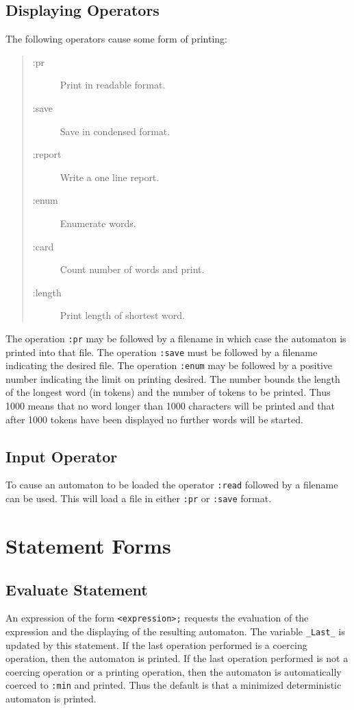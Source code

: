\subsection{Displaying Operators}
The following operators cause some form of printing:
\begin{quote}
\begin{description}
\item[:pr] Print in readable format.
\item[:save] Save in condensed format.
\item[:report] Write a one line report.
\item[:enum] Enumerate words.
\item[:card] Count number of words and print.
\item[:length] Print length of shortest word.
\end{description}
\end{quote}
The operation \verb#:pr# may be followed by a filename in which case the
automaton is printed into that file.
The operation \verb#:save# must be followed by a filename indicating the
desired file.
The operation \verb#:enum# may be followed by a positive number indicating
the limit on printing desired.
The number bounds the length of the longest word (in tokens) and the number
of tokens to be printed.
Thus 1000 means that no word longer than 1000 characters will be printed
and that after 1000 tokens have been displayed no further words will be
started.

\subsection{Input Operator}
To cause an automaton to be loaded the operator \verb#:read# followed by a
filename can be used.
This will load a file in either \verb#:pr# or \verb#:save# format.
\section{Statement Forms}
\subsection{Evaluate Statement}
An expression of the form
\verb#<expression>;#
requests the evaluation of the expression and the displaying of the
resulting automaton.
The variable \verb#_Last_# is updated by this statement.
If the last operation performed is a coercing operation, then the automaton
is printed.
If the last operation performed is not a coercing operation or a printing
operation, then the automaton is automatically coerced to \verb#:min# and
printed.
Thus the default is that a minimized deterministic automaton is printed.

